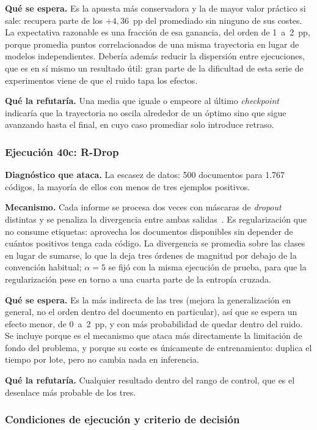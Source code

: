 \textbf{Qué se espera.} Es la apuesta más conservadora y la de mayor valor práctico si sale: recupera parte de los $+4{,}36$~pp del promediado sin ninguno de sus costes. La expectativa razonable es una fracción de esa ganancia, del orden de 1~a~2~pp, porque promedia puntos correlacionados de una misma trayectoria en lugar de modelos independientes. Debería además reducir la dispersión entre ejecuciones, que es en sí mismo un resultado útil: gran parte de la dificultad de esta serie de experimentos viene de que el ruido tapa los efectos.

\textbf{Qué la refutaría.} Una media que iguale o empeore al último \emph{checkpoint} indicaría que la trayectoria no oscila alrededor de un óptimo sino que sigue avanzando hasta el final, en cuyo caso promediar solo introduce retraso.

\subsubsection*{Ejecución 40c: R-Drop}

\textbf{Diagnóstico que ataca.} La escasez de datos: 500 documentos para 1.767 códigos, la mayoría de ellos con menos de tres ejemplos positivos.

\textbf{Mecanismo.} Cada informe se procesa dos veces con máscaras de \emph{dropout} distintas y se penaliza la divergencia entre ambas salidas~\cite{wu2021rdrop}. Es regularización que no consume etiquetas: aprovecha los documentos disponibles sin depender de cuántos positivos tenga cada código. La divergencia se promedia sobre las clases en lugar de sumarse, lo que la deja tres órdenes de magnitud por debajo de la convención habitual; $\alpha=5$ se fijó con la misma ejecución de prueba, para que la regularización pese en torno a una cuarta parte de la entropía cruzada.

\textbf{Qué se espera.} Es la más indirecta de las tres (mejora la generalización en general, no el orden dentro del documento en particular), así que se espera un efecto menor, de 0~a~2~pp, y con más probabilidad de quedar dentro del ruido. Se incluye porque es el mecanismo que ataca más directamente la limitación de fondo del problema, y porque su coste es únicamente de entrenamiento: duplica el tiempo por lote, pero no cambia nada en inferencia.

\textbf{Qué la refutaría.} Cualquier resultado dentro del rango de control, que es el desenlace más probable de los tres.

\subsubsection*{Condiciones de ejecución y criterio de decisión}

